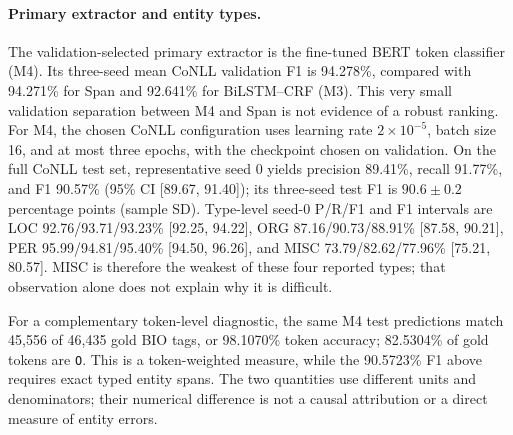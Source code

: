 \paragraph{Primary extractor and entity types.}
The validation-selected primary extractor is the fine-tuned BERT token
classifier (M4). Its three-seed mean CoNLL validation F1 is 94.278\%, compared
with 94.271\% for Span and 92.641\% for BiLSTM--CRF (M3). This very small
validation separation between M4 and Span is not evidence of a robust ranking.
For M4, the chosen CoNLL configuration uses learning rate $2\times10^{-5}$,
batch size 16, and at most three epochs, with the checkpoint chosen on
validation. On the full CoNLL test set, representative seed 0 yields precision
89.41\%, recall 91.77\%, and F1 90.57\% (95\% CI [89.67, 91.40]); its
three-seed test F1 is $90.6\pm0.2$ percentage points (sample SD). Type-level
seed-0 P/R/F1 and F1 intervals are LOC 92.76/93.71/93.23\% [92.25, 94.22],
ORG 87.16/90.73/88.91\% [87.58, 90.21], PER 95.99/94.81/95.40\%
[94.50, 96.26], and MISC 73.79/82.62/77.96\% [75.21, 80.57]. MISC is
therefore the weakest of these four reported types; that observation alone
does not explain why it is difficult.

For a complementary token-level diagnostic, the same M4 test predictions
match 45,556 of 46,435 gold BIO tags, or 98.1070\% token accuracy; 82.5304\%
of gold tokens are \texttt{O}. This is a token-weighted measure, while the
90.5723\% F1 above requires exact typed entity spans. The two quantities use
different units and denominators; their numerical difference is not a causal
attribution or a direct measure of entity errors.

\begin{table}[t]
\centering
\caption{Full native-domain supervised test results, representative seed 0.
Precision (P), recall (R), F1, and sentence-bootstrap F1 interval endpoints
are percentages. M0--M2 are A's classical methods; M3, M4, and Span are B's
neural methods.}
\label{tab:b-native-full}

\end{table}

\begin{table}[t]
\centering
\caption{Neural full-test F1 means and sample standard deviations across three
training seeds, in percentage points. These SDs are not sentence-bootstrap
confidence intervals.}
\label{tab:b-seed-variability}

\end{table}

